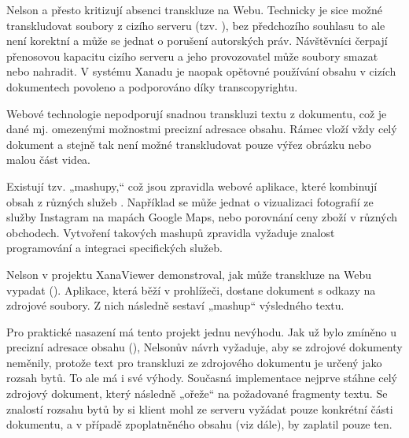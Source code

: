 Nelson a \textcite[31]{Pam1995} přesto kritizují absenci transkluze na Webu.
Technicky je sice možné transkludovat soubory z cizího serveru (tzv. ), bez předchozího souhlasu to ale není korektní a může se jednat o porušení autorských práv. Návštěvníci čerpají přenosovou kapacitu cizího serveru a jeho provozovatel může soubory smazat nebo nahradit. V systému Xanadu je naopak opětovné používání obsahu v cizích dokumentech povoleno a podporováno díky transcopyrightu.

Webové technologie nepodporují snadnou transkluzi textu z dokumentu, což je dané mj. omezenými možnostmi precizní adresace obsahu. Rámec vloží vždy celý dokument a stejně tak není možné transkludovat pouze výřez obrázku nebo malou část videa.

Existují tzv. „mashupy,“ což jsou zpravidla webové aplikace, které kombinují obsah z různých služeb \autocite[3]{Web2.0}.
Například se může jednat o vizualizaci fotografií ze služby Instagram na mapách Google Maps, nebo porovnání ceny zboží v různých obchodech.
Vytvoření takových mashupů zpravidla vyžaduje znalost programování a integraci specifických služeb.

Nelson v projektu XanaViewer demonstroval, jak může transkluze na Webu vypadat (). Aplikace, která běží v prohlížeči, dostane dokument s odkazy na zdrojové soubory. Z nich následně sestaví „mashup“ výsledného textu.

Pro praktické nasazení má tento projekt jednu nevýhodu. Jak už bylo zmíněno u precizní adresace obsahu (), Nelsonův návrh vyžaduje, aby se zdrojové dokumenty neměnily, protože text pro transkluzi ze zdrojového dokumentu je určený jako rozsah bytů. To ale má i své výhody. Současná implementace nejprve stáhne celý zdrojový dokument, který následně „ořeže“ na požadované fragmenty textu. Se znalostí rozsahu bytů by si klient mohl ze serveru vyžádat pouze konkrétní části dokumentu, a v případě zpoplatněného obsahu (viz dále), by zaplatil pouze ten.

% 



